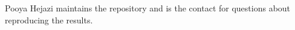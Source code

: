 Pooya Hejazi maintains the repository and is the contact for questions about reproducing the results.

